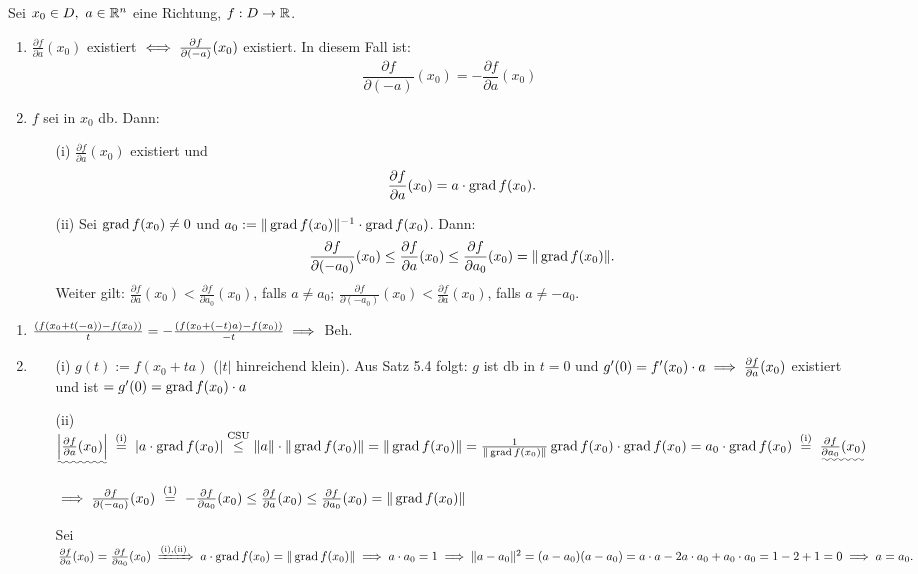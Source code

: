 \documentclass[a4paper,oneside,DIV15,BCOR12mm,chapterprefix=true,headings=onelinechapter]{scrbook}
\begin{document}
\begin{satz}[Richtungsableitungen]
Sei $x_0 \in D,\ a \in \mathbb{R}^n$ eine Richtung, $f:D \to \mathbb{R}$.
\begin{enumerate}
\item $\frac{\partial f}{\partial a}(x_0)$ existiert $\iff \frac{\partial f}{\partial (-a)}(x_0)$ existiert. In diesem Fall ist: $$\frac{\partial f}{\partial (-a)}(x_0) = -\frac{\partial f}{\partial a}(x_0)$$
\item $f$ sei in $x_0$ db. Dann:
\begin{enumerate}
\item[(i)] $\frac{\partial f}{\partial a}(x_0)$ existiert und $$\frac{\partial f}{\partial a}(x_0) = a\cdot \mathop{\rm grad}\nolimits f(x_0).$$
\item[(ii)] Sei $\mathop{\rm grad}\nolimits f(x_0) \ne 0$ und $a_0 := \|\mathop{\rm grad}\nolimits f(x_0)\|^{-1}\cdot \mathop{\rm grad}\nolimits f(x_0)$. Dann: $$\frac{\partial f}{\partial (-a_0)}(x_0) \le \frac{\partial f}{\partial a}(x_0) \le \frac{\partial f}{\partial a_0}(x_0) = \|\mathop{\rm grad}\nolimits f(x_0)\|.$$ Weiter gilt: $\frac{\partial f}{\partial a}(x_0) < \frac{\partial f}{\partial a_0}(x_0)$, falls $a \ne a_0$; $\frac{\partial f}{\partial (-a_0)}(x_0) < \frac{\partial f}{\partial a}(x_0)$, falls $a \ne -a_0$.
\end{enumerate}
\end{enumerate}
\end{satz}

\begin{beweis}
\begin{enumerate}
\item $\frac{(f(x_0+t(-a))-f(x_0))}{t} = -\frac{(f(x_0+(-t)a)-f(x_0))}{-t} \implies$ Beh.
\item \begin{enumerate}
\item[(i)] $g(t) := f(x_0+ta)$ ($|t|$ hinreichend klein). Aus Satz 5.4 folgt: $g$ ist db in $t=0$ und $g'(0) = f'(x_0) \cdot a \implies \frac{\partial f}{\partial a}(x_0)$ existiert und ist $= g'(0) = \mathop{\rm grad}\nolimits f(x_0)\cdot a$
\item[(ii)] $\uwave{\left| \frac{\partial f}{\partial a}(x_0) \right|} \gleichnach{(i)} |a\cdot \grad f(x_0)| \overset{\text{CSU}}{\le} \|a\|\cdot \|\grad f(x_0)\| = \|\grad f(x_0)\| = \frac{1}{\|\grad f(x_0)\|} \grad f(x_0) \cdot \grad f(x_0) = a_0\cdot \grad f(x_0) \gleichnach{(i)} \uwave{\frac{\partial f}{\partial a_0}(x_0)}$

$\folgt \frac{\partial f}{\partial (-a_0)}(x_0) \gleichnach{(1)} -\frac{\partial f}{\partial a_0}(x_0) \le \frac{\partial f}{\partial a}(x_0) \le \frac{\partial f}{\partial a_0}(x_0) = \|\grad f(x_0)\|$

Sei $\frac{\partial f}{\partial a}(x_0) = \frac{\partial f}{\partial a_0}(x_0) \folgtnach{(i),(ii)} a\cdot\grad f(x_0) = \|\grad f(x_0)\| \folgt a\cdot a_0 = 1 \folgt \|a-a_0\|^2 = (a-a_0)(a-a_0) = a\cdot a - 2a\cdot a_0 + a_0\cdot a_0 = 1-2+1 = 0 \folgt a=a_0.$
\end{enumerate}
\end{enumerate}
\end{beweis}
\end{document}
